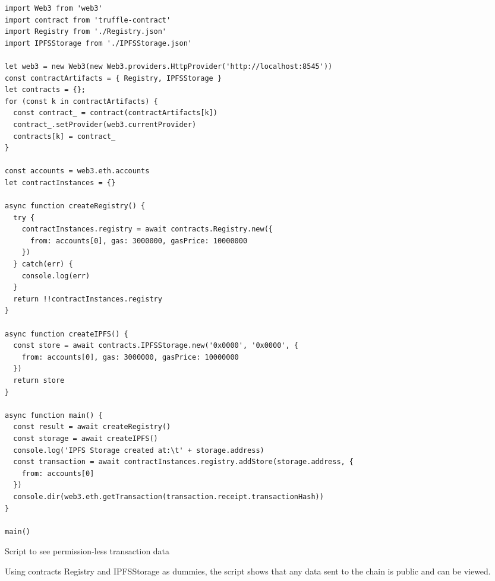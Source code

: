 \begin{listing}[H]
  \centering
  \begin{verbatim}
import Web3 from 'web3'
import contract from 'truffle-contract'
import Registry from './Registry.json'
import IPFSStorage from './IPFSStorage.json'

let web3 = new Web3(new Web3.providers.HttpProvider('http://localhost:8545'))
const contractArtifacts = { Registry, IPFSStorage }
let contracts = {};
for (const k in contractArtifacts) {
  const contract_ = contract(contractArtifacts[k])
  contract_.setProvider(web3.currentProvider)
  contracts[k] = contract_
}

const accounts = web3.eth.accounts
let contractInstances = {}

async function createRegistry() {
  try {
    contractInstances.registry = await contracts.Registry.new({
      from: accounts[0], gas: 3000000, gasPrice: 10000000
    })
  } catch(err) {
    console.log(err)
  }
  return !!contractInstances.registry
}

async function createIPFS() {
  const store = await contracts.IPFSStorage.new('0x0000', '0x0000', {
    from: accounts[0], gas: 3000000, gasPrice: 10000000
  })
  return store
}

async function main() {
  const result = await createRegistry()
  const storage = await createIPFS()
  console.log('IPFS Storage created at:\t' + storage.address)
  const transaction = await contractInstances.registry.addStore(storage.address, {
    from: accounts[0]
  })
  console.dir(web3.eth.getTransaction(transaction.receipt.transactionHash))
}

main()
  \end{verbatim}
  \caption{
    Script to see permission-less transaction data
  }{
    Using contracts Registry and IPFSStorage as dummies, the script shows that any data sent to the chain is public and can be viewed.
  }
  \label{code:view_storage_data}
\end{listing}
